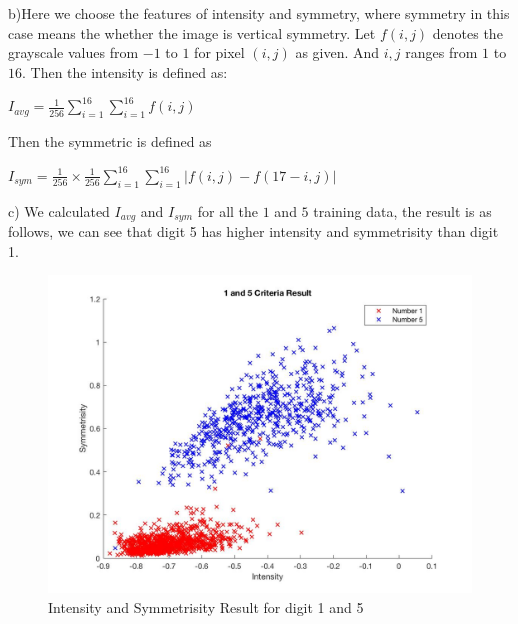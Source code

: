 \documentclass[12pt]{article}
\begin{document}
b)Here we choose the features of intensity and symmetry, where symmetry in this case means the whether the image is vertical symmetry. Let $f(i,j)$ denotes the grayscale values from $-1$ to $1$ for pixel $(i,j)$ as given. And $i,j$ ranges from $1$ to $16$. Then the intensity is defined as:\begin{center} $\displaystyle I_{avg} = \frac{1}{256}\sum_{i = 1}^{16} \sum_{i = 1}^{16} f(i,j)$
\end{center}
Then the symmetric is defined as \begin{center} 
$\displaystyle I_{sym} = \frac{1}{256}\times\frac{1}{256}\sum_{i = 1}^{16} \sum_{i = 1}^{16} |f(i,j)-f(17-i,j)|$
\end{center}
c) We calculated $I_{avg}$ and $I_{sym}$ for all the $1$ and $5$ training data, the result is as follows, we can see that digit 5 has higher intensity and symmetrisity than digit 1.
\begin{figure}[H]
  \centering
  \includegraphics[scale = 0.3]{crit.jpg}
  \caption{Intensity and Symmetrisity Result for digit 1 and 5}
  \label{fig:Pic2}
\end{figure}
\end{document}
